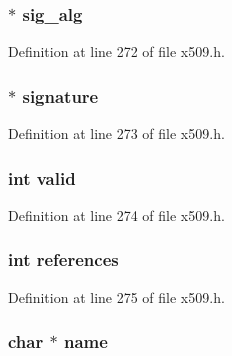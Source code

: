 \subsubsection[{\texorpdfstring{sig\+\_\+alg}{sig_alg}}]{ $\ast$ sig\+\_\+alg}\hypertarget{structx509__st_a48635ef8176d7ad1ab56a1088f7321fb}{}\label{structx509__st_a48635ef8176d7ad1ab56a1088f7321fb}


Definition at line 272 of file x509.\+h.

\subsubsection[{\texorpdfstring{signature}{signature}}]{ $\ast$ signature}\hypertarget{structx509__st_a0ded22400c40848a864a98aeb7946f1a}{}\label{structx509__st_a0ded22400c40848a864a98aeb7946f1a}


Definition at line 273 of file x509.\+h.

\subsubsection[{\texorpdfstring{valid}{valid}}]{\setlength{\rightskip}{0pt plus 5cm}int valid}\hypertarget{structx509__st_ac63b1f168765a53e565a8ba27f5469d1}{}\label{structx509__st_ac63b1f168765a53e565a8ba27f5469d1}


Definition at line 274 of file x509.\+h.

\subsubsection[{\texorpdfstring{references}{references}}]{\setlength{\rightskip}{0pt plus 5cm}int references}\hypertarget{structx509__st_a146fdb34d9a909e530adf8b189481195}{}\label{structx509__st_a146fdb34d9a909e530adf8b189481195}


Definition at line 275 of file x509.\+h.

\subsubsection[{\texorpdfstring{name}{name}}]{\setlength{\rightskip}{0pt plus 5cm}char $\ast$ name}\hypertarget{structx509__st_ad547fb8186b526cb1b588daad4334fbe}{}\label{structx509__st_ad547fb8186b526cb1b588daad4334fbe}


